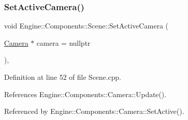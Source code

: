 \mbox{\label{classEngine_1_1Components_1_1Scene_a936218df56c481f3aa12d684cee038f3}} 
\subsubsection{\texorpdfstring{Set\+Active\+Camera()}{SetActiveCamera()}}
{\footnotesize\ttfamily void Engine\+::\+Components\+::\+Scene\+::\+Set\+Active\+Camera (\begin{DoxyParamCaption}\item[{\mbox{\hyperlink{classEngine_1_1Components_1_1Camera}{Camera}} $\ast$}]{camera = {\ttfamily nullptr} }\end{DoxyParamCaption})\hspace{0.3cm}{\ttfamily [virtual]}, {\ttfamily [inherited]}}



Definition at line 52 of file Scene.\+cpp.



References Engine\+::\+Components\+::\+Camera\+::\+Update().



Referenced by Engine\+::\+Components\+::\+Camera\+::\+Set\+Active().


